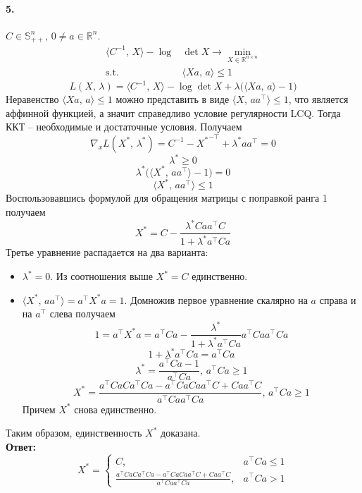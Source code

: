 \documentclass{article}
\newcommand*{\R}{\mathbb{R}}
\newcommand*{\st}{\text{s.t. }}
\newcommand*{\1}{\mathbf{1}}
\begin{document}
\paragraph{5.} $C \in \mathbb{S}_{++}^n,\, 0 \neq a \in \R^n$.
\[ \begin{split} 
    \langle C^{-1},\, X \rangle - \log&\det X \to \min\limits_{X \in \R^{n \times n}} \\
    \st & \langle Xa,\, a \rangle \leqslant 1
\end{split} \]
\[ L(X,\, \lambda) = \langle C^{-1},\, X \rangle - \log\det X + \lambda \big( \langle Xa,\, a \rangle - 1 \big) \]
Неравенство $\langle Xa,\, a \rangle \leqslant 1$ можно представить в виде $\langle X,\, aa^\top \rangle \leqslant 1$, что является аффинной функцией, а значит справедливо условие регулярности LCQ. Тогда ККТ -- необходимые и достаточные условия. Получаем
\[ \nabla_x L(X^\ast,\, \lambda^\ast) = C^{-1} - {X^\ast}^{-\top} + \lambda^\ast aa^\top = 0 \]
\[ \lambda^\ast \geqslant 0 \]
\[ \lambda^\ast \big( \langle X^\ast,\, a a^\top \rangle - 1 \big) = 0 \]
\[ \langle X^\ast,\, a a^\top \rangle \leqslant 1 \]
Воспользовавшись формулой для обращения матрицы с поправкой ранга 1 получаем
\[ X^\ast = C - \frac{\lambda^\ast C aa^\top C}{1 + \lambda^\ast a^\top C a} \]
Третье уравнение распадается на два варианта:
\begin{itemize}
    \item $\lambda^\ast = 0$. Из соотношения выше $X^\ast = C$ единственно.
    \item $\langle X^\ast,\, a a^\top \rangle = a^\top X^\ast a = 1$. Домножив первое уравнение скалярно на $a$ справа и на $a^\top$ слева получаем
        \[ 1 = a^\top X^\ast a = a^\top C a - \frac{\lambda^\ast}{1 + \lambda^\ast a^\top C a} a^\top C a a^\top C a \]
        \[ 1 + \lambda^\ast a^\top C a = a^\top C a \]
        \[ \lambda^\ast = \frac{a^\top C a - 1}{a^\top C a},\, a^\top C a \geqslant 1 \]
        \[ X^\ast = \frac{a^\top C a Ca^\top C a - a^\top C a C a a^\top C + C a a^\top C}{a^\top C a a^\top C a},\, a^\top C a \geqslant 1 \]
        Причем $X^\ast$ снова единственно.
\end{itemize}
Таким образом, единственность $X^\ast$ доказана. \\
\textbf{Ответ: } \[ X^\ast = \begin{cases}
    C, & a^\top C a \leqslant 1 \\
    \frac{a^\top C a Ca^\top C a - a^\top C a C a a^\top C + C a a^\top C}{a^\top C a a^\top C a}, & a^\top C a > 1
\end{cases} \]
\end{document}
